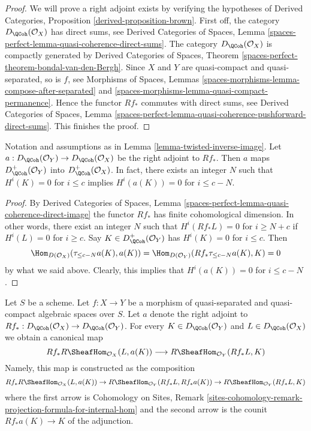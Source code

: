 \begin{proof}
We will prove a right adjoint exists by verifying the hypotheses of
Derived Categories, Proposition \ref{derived-proposition-brown}.
First off, the category $D_\QCoh(\mathcal{O}_X)$ has direct sums, see
Derived Categories of Spaces, Lemma
\ref{spaces-perfect-lemma-quasi-coherence-direct-sums}.
The category $D_\QCoh(\mathcal{O}_X)$ is compactly generated by
Derived Categories of Spaces, Theorem
\ref{spaces-perfect-theorem-bondal-van-den-Bergh}.
Since $X$ and $Y$ are quasi-compact and quasi-separated, so is $f$, see
Morphisms of Spaces, Lemmas
\ref{spaces-morphisms-lemma-compose-after-separated} and
\ref{spaces-morphisms-lemma-quasi-compact-permanence}.
Hence the functor $Rf_*$ commutes with direct sums, see
Derived Categories of Spaces, Lemma
\ref{spaces-perfect-lemma-quasi-coherence-pushforward-direct-sums}.
This finishes the proof.
\end{proof}

\begin{lemma}
\label{lemma-twisted-inverse-image-bounded-below}
Notation and assumptions as in Lemma \ref{lemma-twisted-inverse-image}.
Let $a : D_\QCoh(\mathcal{O}_Y) \to D_\QCoh(\mathcal{O}_X)$ be the right
adjoint to $Rf_*$. Then $a$ maps
$D^+_\QCoh(\mathcal{O}_Y)$ into $D^+_\QCoh(\mathcal{O}_X)$.
In fact, there exists an integer $N$ such that
$H^i(K) = 0$ for $i \leq c$ implies $H^i(a(K)) = 0$ for $i \leq c - N$.
\end{lemma}

\begin{proof}
By Derived Categories of Spaces, Lemma
\ref{spaces-perfect-lemma-quasi-coherence-direct-image}
the functor $Rf_*$ has finite cohomological dimension. In other words,
there exist an integer $N$ such that
$H^i(Rf_*L) = 0$ for $i \geq N + c$ if $H^i(L) = 0$ for $i \geq c$.
Say $K \in D^+_\QCoh(\mathcal{O}_Y)$ has $H^i(K) = 0$ for $i \leq c$.
Then
$$
\Hom_{D(\mathcal{O}_X)}(\tau_{\leq c - N}a(K), a(K)) =
\Hom_{D(\mathcal{O}_Y)}(Rf_*\tau_{\leq c - N}a(K), K) = 0
$$
by what we said above. Clearly, this implies that
$H^i(a(K)) = 0$ for $i \leq c - N$.
\end{proof}

\noindent
Let $S$ be a scheme.
Let $f : X \to Y$ be a morphism of quasi-separated and quasi-compact
algebraic spaces over $S$.
Let $a$ denote the right adjoint to
$Rf_* : D_\QCoh(\mathcal{O}_X) \to D_\QCoh(\mathcal{O}_Y)$. For every
$K \in D_\QCoh(\mathcal{O}_Y)$ and $L \in D_\QCoh(\mathcal{O}_X)$
we obtain a canonical map
\begin{equation}
\label{equation-sheafy-trace}
Rf_*R\SheafHom_{\mathcal{O}_X}(L, a(K))
\longrightarrow
R\SheafHom_{\mathcal{O}_Y}(Rf_*L, K)
\end{equation}
Namely, this map is constructed as the composition
$$
Rf_*R\SheafHom_{\mathcal{O}_X}(L, a(K)) \to
R\SheafHom_{\mathcal{O}_Y}(Rf_*L, Rf_*a(K)) \to
R\SheafHom_{\mathcal{O}_Y}(Rf_*L, K)
$$
where the first arrow is 
Cohomology on Sites, Remark
\ref{sites-cohomology-remark-projection-formula-for-internal-hom}
and the second arrow is the counit $Rf_*a(K) \to K$ of the adjunction.

